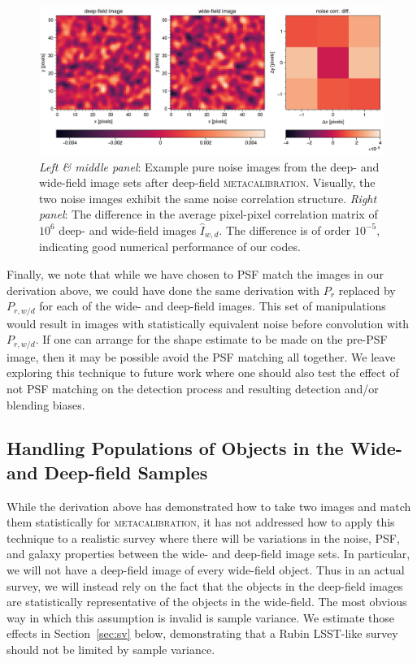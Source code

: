 \documentclass[twocolumn]{openjournal}
\makeatletter
\newcommand{\mcal}{\textsc{metacalibration}\@\xspace}
\makeatother
\begin{document}
\begin{figure}
    \centering
    \includegraphics[width=\linewidth]{noise_corr.png}
    \caption{
      \textit{Left \& middle panel}: Example pure noise images from the deep- and wide-field image
      sets after deep-field \mcal. Visually, the two noise images exhibit the same noise correlation structure.
      \textit{Right panel}: The difference in the average pixel-pixel correlation matrix of $10^6$ deep- and
      wide-field images $\hat I_{w,d}$. The difference is of order $10^{-5}$, indicating good numerical
      performance of our codes.
    } \label{fig:pixel_correlation}
\end{figure}


Finally, we note that while we have chosen to PSF match the images in our derivation
above, we could have done the same derivation with $P_{r}$ replaced by $P_{r,w/d}$ for
each of the wide- and deep-field images. This set of manipulations would result in
images with statistically equivalent noise before convolution with $P_{r,w/d}$. If one
can arrange for the shape estimate to be made on the pre-PSF image, then it may be
possible avoid the PSF matching all together. We leave exploring this technique to
future work where one should also test the effect of not PSF matching on the detection
process and resulting detection and/or blending biases.

\subsection{Handling Populations of Objects in the Wide- and Deep-field Samples}\label{sec:statmatch}

While the derivation above has demonstrated how to take two images and match them
statistically for \mcal, it has not addressed how to apply this technique to a realistic
survey where there will be variations in the noise, PSF, and galaxy properties between
the wide- and deep-field image sets. In particular, we will not have a deep-field image
of every wide-field object. Thus in an actual survey, we will instead rely on the fact
that the objects in the deep-field images are statistically representative of the
objects in the wide-field. The most obvious way in which this assumption is invalid is sample variance.
We estimate those effects in Section~\ref{sec:sv} below, demonstrating that a Rubin
LSST-like survey should not be limited by sample variance.
\end{document}
